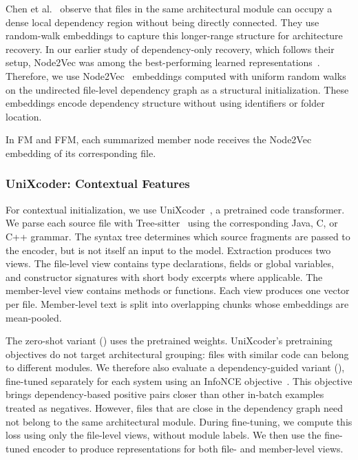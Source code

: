Chen et al.~\citep{negar} observe that files in the same architectural module can occupy a dense local dependency region without being directly connected. They use random-walk embeddings to capture this longer-range structure for architecture recovery. In our earlier study of dependency-only recovery, which follows their setup, Node2Vec was among the best-performing learned representations~\cite{structsar}. Therefore, we use Node2Vec~\cite{node2vec} embeddings computed with uniform random walks on the undirected file-level dependency graph as a structural initialization. These embeddings encode dependency structure without using identifiers or folder location.

In FM and FFM, each summarized member node receives the Node2Vec embedding of its corresponding file.

\subsubsection{UniXcoder: Contextual Features \label{sec:unixcoder}}

For contextual initialization, we use UniXcoder~\cite{unixcoder}, a pretrained code transformer. We parse each source file with Tree-sitter~\cite{tree_sitter} using the corresponding Java, C, or C++ grammar. The syntax tree determines which source fragments are passed to the encoder, but is not itself an input to the model. Extraction produces two views. The file-level view contains type declarations, fields or global variables, and constructor signatures with short body excerpts where applicable. The member-level view contains methods or functions. Each view produces one vector per file. Member-level text is split into overlapping chunks whose embeddings are mean-pooled.

The zero-shot variant (\zs{}) uses the pretrained weights. UniXcoder's pretraining objectives do not target architectural grouping: files with similar code can belong to different modules. We therefore also evaluate a dependency-guided variant (\ft{}), fine-tuned separately for each system using an InfoNCE objective~\cite{infonce}. This objective brings dependency-based positive pairs closer than other in-batch examples treated as negatives. However, files that are close in the dependency graph need not belong to the same architectural module. During fine-tuning, we compute this loss using only the file-level views, without module labels. We then use the fine-tuned encoder to produce representations for both file- and member-level views.

